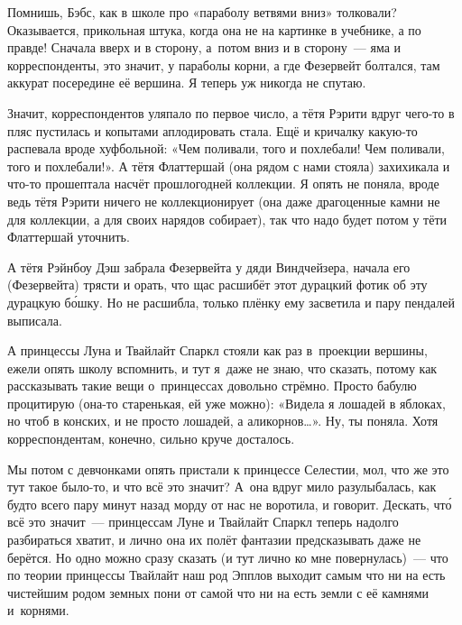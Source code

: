 \documentclass[fontsize=11pt,a5paper,titlepage=firstcover]{scrbook}
\begin{document}
Помнишь, Бэбс, как в школе про «параболу ветвями вниз» толковали? Оказывается, прикольная штука, когда она не на картинке в учебнике, а по правде! Сначала вверх и в сторону, а~потом вниз и в сторону~--- яма и корреспонденты, это значит, у параболы корни, а где Фезервейт болтался, там аккурат посередине её вершина. Я теперь уж никогда не спутаю.

Значит, корреспондентов уляпало по первое число, а тётя Рэрити вдруг чего-то в пляс пустилась и копытами аплодировать стала. Ещё и кричалку какую-то распевала вроде хуфбольной: «Чем поливали, того и похлебали! Чем поливали, того и похлебали!». А тётя Флаттершай (она рядом с нами стояла) захихикала и что-то прошептала насчёт прошлогодней коллекции. Я опять не поняла, вроде ведь тётя Рэрити ничего не коллекционирует (она даже драгоценные камни не для коллекции, а для своих нарядов собирает), так что надо будет потом у тёти Флаттершай уточнить.

А тётя Рэйнбоу Дэш забрала Фезервейта у дяди Виндчейзера, начала его (Фезервейта) трясти и орать, что щас расшибёт этот дурацкий фотик об эту дурацкую бо́шку. Но не расшибла, только плёнку ему засветила и пару пендалей выписала.

А принцессы Луна и Твайлайт Спаркл стояли как раз в~проекции вершины, ежели опять школу вспомнить, и тут я~даже не знаю, что сказать, потому как рассказывать такие вещи о~принцессах довольно стрёмно. Просто бабулю процитирую (она-то старенькая, ей уже можно): «Видела я лошадей в яблоках, но чтоб в конских, и не просто лошадей, а аликорнов{\ldots}». Ну, ты поняла. Хотя корреспондентам, конечно, сильно круче досталось.

Мы потом с девчонками опять пристали к принцессе Селестии, мол, что же это тут такое было-то, и что всё это значит? А~она вдруг мило разулыбалась, как будто всего пару минут назад морду от нас не воротила, и говорит. Дескать, что́ всё это значит~--- принцессам Луне и Твайлайт Спаркл теперь надолго разбираться хватит, и лично она их полёт фантазии предсказывать даже не берётся. Но одно можно сразу сказать (и тут лично ко мне повернулась)~--- что по теории принцессы Твайлайт наш род Эпплов выходит самым что ни на есть чистейшим родом земных пони от самой что ни на есть земли с её камнями и~корнями.
\end{document}
